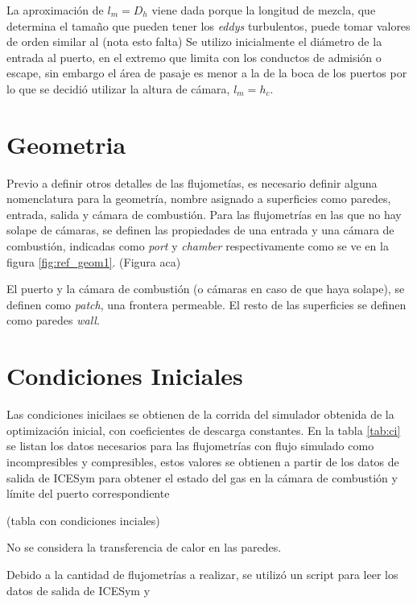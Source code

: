 La aproximación de $l_m = D_h$ viene dada porque la longitud de mezcla, que
determina el tamaño que pueden tener los \emph{eddys} turbulentos, puede tomar
valores de orden similar al (nota esto falta)
%
Se utilizo inicialmente el diámetro de la entrada al puerto, en el extremo que
limita con los conductos de admisión o escape, sin embargo el área de pasaje es
menor a la de la boca de los puertos por lo que se decidió utilizar la altura de
cámara, $l_m = h_c$.



\section{Geometria}
Previo a definir otros detalles de las flujometías, es necesario definir alguna
nomenclatura para la geometría, nombre asignado a superficies como paredes,
entrada, salida y cámara de combustión.
%
Para las flujometrías en las que no hay solape de cámaras, se definen las
propiedades de una entrada y una cámara de combustión, indicadas como
\emph{port} y \emph{chamber} respectivamente como se ve en la figura
\ref{fig:ref_geom1}.
%
(Figura aca)

El puerto y la cámara de combustión (o cámaras en caso de que haya solape), se
definen como \emph{patch}, una frontera permeable.
%
El resto de las superficies se definen como paredes \emph{wall}.


\section{Condiciones Iniciales}
%
Las condiciones inicilaes se obtienen de la corrida del simulador obtenida de
la optimización inicial, con coeficientes de descarga constantes.
%
En la tabla \ref{tab:ci} se listan los datos necesarios para las flujometrías
con flujo simulado como incompresibles y compresibles, estos valores se obtienen
a partir de los datos de salida de ICESym para obtener el estado del gas
en la cámara de combustión y límite del puerto correspondiente

(tabla con condiciones inciales)

No se considera la transferencia de calor en las paredes.

Debido a la cantidad de flujometrías a realizar, se utilizó un script para leer los
datos de salida de ICESym y

